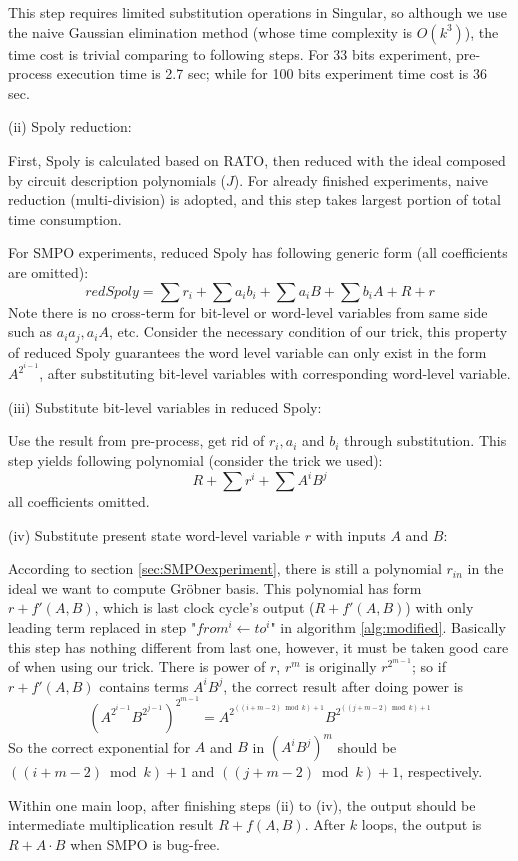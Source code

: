This step requires limited substitution operations in Singular, so although we use the naive Gaussian elimination
method (whose time complexity is $O(k^3)$), the time cost is trivial comparing to following steps. For 33 bits experiment,
pre-process execution time is 2.7 sec; while for 100 bits experiment time cost is 36 sec.

(ii) Spoly reduction:

First, Spoly is calculated based on RATO, then reduced with the ideal composed by circuit description polynomials ($J$).
For already finished experiments, naive reduction (multi-division) is adopted, and this step takes largest portion of total 
time consumption.

For SMPO experiments, reduced Spoly has following generic form (all coefficients are omitted):
$$redSpoly = \sum r_i + \sum a_ib_i + \sum a_iB + \sum b_iA + R + r$$
Note there is no cross-term for bit-level or word-level variables from same side such as $a_ia_j, a_iA$, etc. Consider the necessary
condition of our trick, this property of reduced Spoly guarantees the word level variable can only exist in the form $A^{2^{i-1}}$,
after substituting bit-level variables with corresponding word-level variable.

(iii) Substitute bit-level variables in reduced Spoly:

Use the result from pre-process, get rid of $r_i, a_i$ and $b_i$ through substitution. This step yields following polynomial (consider the trick we used):
$$R + \sum r^i + \sum A^iB^j$$
all coefficients omitted.

(iv) Substitute present state word-level variable $r$ with inputs $A$ and $B$:

According to section \ref{sec:SMPOexperiment}, there is still a polynomial $r_{in}$ in the ideal we want to compute Gr\"obner basis.
This polynomial has form $r+f'(A,B)$, which is last clock cycle's output ($R+f'(A,B)$) with only leading term replaced in step "$from^i\gets to^i$" in 
algorithm \ref{alg:modified}. Basically this step has nothing different from last one, however, it must be taken good care of when using our
trick. There is power of $r$, $r^m$ is originally $r^{2^{m-1}}$; so if $r+f'(A,B)$ contains terms $A^iB^j$, the correct result after doing power
is $$(A^{2^{i-1}}B^{2^{j-1}})^{2^{m-1}} = A^{2^{((i+m-2)\bmod k)+1}}B^{2^{((j+m-2)\bmod k)+1}}$$
So the correct exponential for $A$ and $B$ in $(A^iB^j)^m$ should be $((i+m-2)\bmod k)+1$ and $((j+m-2)\bmod k)+1$, respectively.

Within one main loop, after finishing steps (ii) to (iv), the output should be intermediate multiplication result $R+f(A,B)$. After $k$ loops,
the output is $R+A\cdot B$ when SMPO is bug-free.

